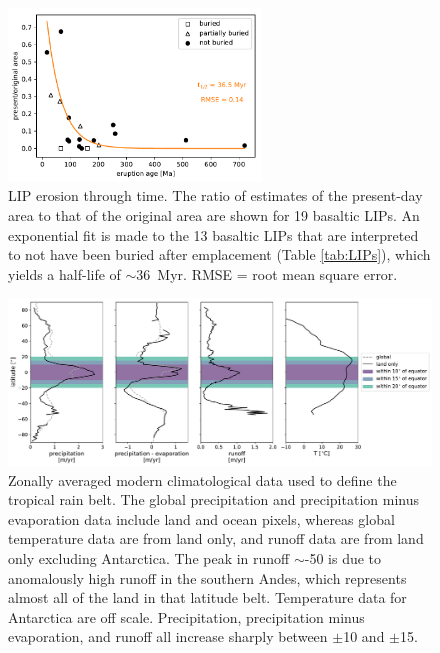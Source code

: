 \documentclass[11pt,letterpaper]{article}
\begin{document}
\begin{figure}[h!]
\begin{center}
	\includegraphics[width=0.6\textwidth]{Manuscript/Figures/LIP_Preservation.pdf}
	\caption{LIP erosion through time. The ratio of estimates of the present-day area to that of the original area are shown for 19 basaltic LIPs. An exponential fit is made to the 13 basaltic LIPs that are interpreted to not have been buried after emplacement (Table \ref{tab:LIPs}), which yields a half-life of $\sim$36~Myr. RMSE = root mean square error.}
	\label{fig:LIP_preservation}
\end{center}
\end{figure}

\begin{figure}[h!]
\begin{center}
	\includegraphics[width=\textwidth]{Manuscript/Figures/Climatology.pdf}
	\caption{Zonally averaged modern climatological data used to define the tropical rain belt. The global precipitation \citep{Kalnay1996a} and precipitation minus evaporation \citep{Trenberth2011a} data include land and ocean pixels, whereas global temperature data \citep{Kalnay1996a} are from land only, and runoff data \citep{Fekete1999a} are from land only excluding Antarctica. The peak in runoff $\sim$-50\textdegree\xspace is due to anomalously high runoff in the southern Andes, which represents almost all of the land in that latitude belt. Temperature data for Antarctica are off scale. Precipitation, precipitation minus evaporation, and runoff all increase sharply between $\pm$10\textdegree\xspace and $\pm$15\textdegree\xspace.}
	\label{fig:Climatology}
\end{center}
\end{figure}
\end{document}
